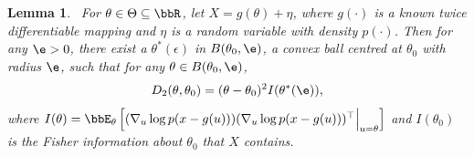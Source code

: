 \documentclass[11pt]{article}
\newtheorem{lemma}[theorem]{Lemma}
\begin{document}
\begin{lemma}~\label{lem:QuadApp}
    For $\theta \in \Theta\subseteq \bbR$, let $X = g(\theta) + \eta$, where $g(\cdot)$ is a known twice differentiable mapping and $\eta$ is a random variable with density $p(\cdot)$. Then for any $\e>0$, there exist a $\theta^*(\epsilon)$ in $B(\theta_0,\e)$, a convex ball centred at $\theta_0$ with radius $\e$, such that for any $\theta\in B(\theta_0,\e)$,
    \begin{align}
        D_2(\theta,\theta_0) = (\theta-\theta_0)^2  I(\theta^*(\e)),
    \end{align}
    where 
   $I(\theta ) = \bbE_{\theta} \left[ ( \nabla_{u} \log p(x-g(u)) ) ( \nabla_{u}\log p(x-g(u)) )^\top \Big |_{u = \theta}   \right] $ and $I(\theta_0)$ is the Fisher information about $\theta_0$ that $X$ contains. 
 \end{lemma}
\end{document}
